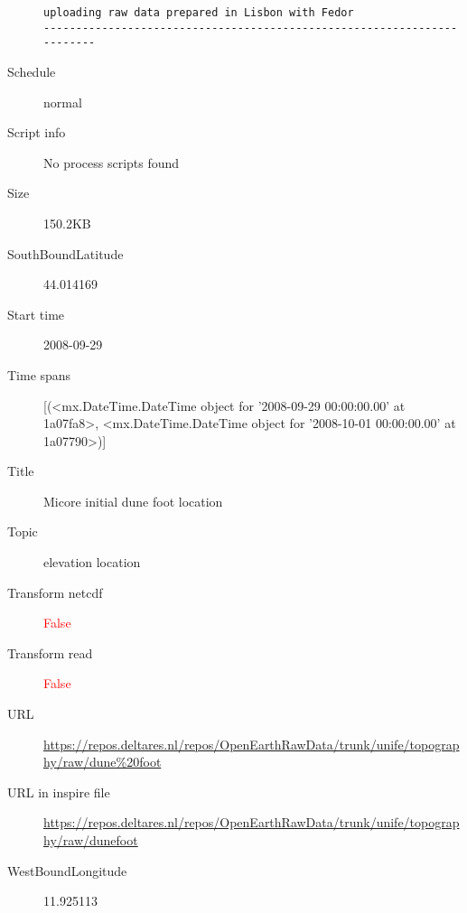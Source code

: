 \documentclass[9]{report}
\begin{document}
\begin{description}
\begin{verbatim}
uploading raw data prepared in Lisbon with Fedor
------------------------------------------------------------------------

\end{verbatim}
  \item[Schedule] normal
  \item[Script info] No process scripts found
  \item[Size] 150.2KB
  \item[SouthBoundLatitude] 44.014169
  \item[Start time] 2008-09-29
  \item[Time spans] [(<mx.DateTime.DateTime object for '2008-09-29 00:00:00.00' at 1a07fa8>, <mx.DateTime.DateTime object for '2008-10-01 00:00:00.00' at 1a07790>)]
  \item[Title]  Micore initial dune foot location 
  \item[Topic] elevation location
  \item[Transform netcdf] \textcolor{red}{False}
  \item[Transform read] \textcolor{red}{False}
  \item[URL] \href{https://repos.deltares.nl/repos/OpenEarthRawData/trunk/unife/topography/raw/dune\%20foot}{https://repos.deltares.nl/repos/OpenEarthRawData/trunk/unife/topography/raw/dune\%20foot}
  \item[URL in inspire file] \href{https://repos.deltares.nl/repos/OpenEarthRawData/trunk/unife/topography/raw/dunefoot}{https://repos.deltares.nl/repos/OpenEarthRawData/trunk/unife/topography/raw/dunefoot}
  \item[WestBoundLongitude] 11.925113
\end{description}
\end{document}
